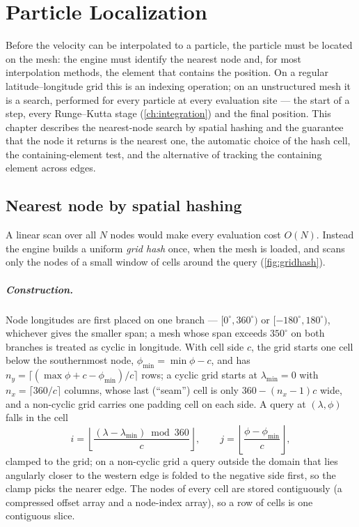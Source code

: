 \chapter{Particle Localization}\label{ch:localization}

Before the velocity can be interpolated to a particle, the particle must be located on the mesh:
the engine must identify the nearest node and, for most interpolation methods, the element that
contains the position. On a regular latitude--longitude grid this is an indexing operation; on an
unstructured mesh it is a search, performed for every particle at every evaluation site --- the
start of a step, every Runge--Kutta stage (\cref{ch:integration}) and the final position. This
chapter describes the nearest-node search by spatial hashing and the guarantee that the node it
returns is the nearest one, the automatic choice of the hash cell, the containing-element test, and
the alternative of tracking the containing element across edges.

\section{Nearest node by spatial hashing}\label{sec:loc-nearest}

A linear scan over all $N$ nodes would make every evaluation cost $O(N)$. Instead the engine builds a
uniform \emph{grid hash} once, when the mesh is loaded, and scans only the nodes of a small window of
cells around the query (\cref{fig:gridhash}). 

\paragraph{Construction.} Node longitudes are first placed on one branch --- $[0^\circ,360^\circ)$ or
$[-180^\circ,180^\circ)$, whichever gives the smaller span; a mesh whose span exceeds $350^\circ$ on
both branches is treated as cyclic in longitude. With cell side $c$, the grid starts one cell below
the southernmost node, $\phi_{\min}=\min\phi-c$, and has $n_y=\lceil(\max\phi+c-\phi_{\min})/c\rceil$
rows; a cyclic grid starts at $\lambda_{\min}=0$ with $n_x=\lceil 360/c\rceil$ columns, whose last
(``seam'') cell is only $360-(n_x-1)c$ wide, and a non-cyclic grid carries one padding cell on each
side. A query at $(\lambda,\phi)$ falls in the cell
\begin{equation}\label{eq:loc-cell}
  i=\left\lfloor\frac{(\lambda-\lambda_{\min})\bmod 360}{c}\right\rfloor,\qquad
  j=\left\lfloor\frac{\phi-\phi_{\min}}{c}\right\rfloor,
\end{equation}
clamped to the grid; on a non-cyclic grid a query outside the domain that lies angularly closer to the
western edge is folded to the negative side first, so the clamp picks the nearer edge. The nodes of every cell are stored contiguously (a compressed offset array and
a node-index array), so a row of cells is one contiguous slice.

